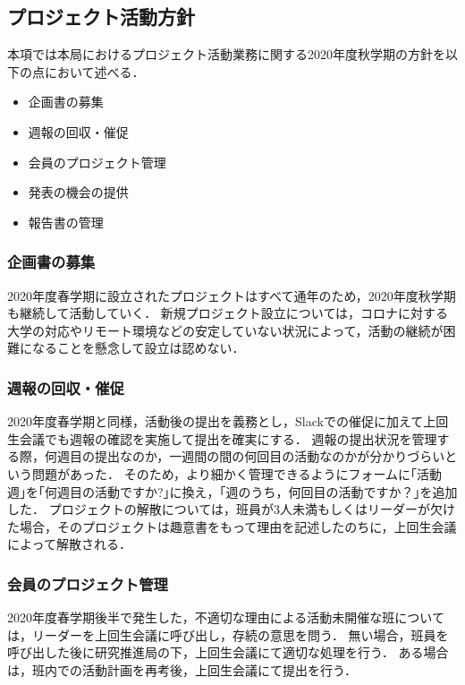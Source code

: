 \subsection*{プロジェクト活動方針}


本項では本局におけるプロジェクト活動業務に関する2020年度秋学期の方針を以下の点において述べる．

\begin{itemize}
\item 企画書の募集
\item 週報の回収・催促
\item 会員のプロジェクト管理
\item 発表の機会の提供
\item 報告書の管理
\end{itemize}

\subsubsection*{企画書の募集}

2020年度春学期に設立されたプロジェクトはすべて通年のため，2020年度秋学期も継続して活動していく．
新規プロジェクト設立については，コロナに対する大学の対応やリモート環境などの安定していない状況によって，活動の継続が困難になることを懸念して設立は認めない．

\subsubsection*{週報の回収・催促}

2020年度春学期と同様，活動後の提出を義務とし，Slackでの催促に加えて上回生会議でも週報の確認を実施して提出を確実にする．
週報の提出状況を管理する際，何週目の提出なのか，一週間の間の何回目の活動なのかが分かりづらいという問題があった．
そのため，より細かく管理できるようにフォームに｢活動週｣を｢何週目の活動ですか?｣に換え，｢週のうち，何回目の活動ですか？｣を追加した．
プロジェクトの解散については，班員が3人未満もしくはリーダーが欠けた場合，そのプロジェクトは趣意書をもって理由を記述したのちに，上回生会議によって解散される．

\subsubsection*{会員のプロジェクト管理}

2020年度春学期後半で発生した，不適切な理由による活動未開催な班については，リーダーを上回生会議に呼び出し，存続の意思を問う．
無い場合，班員を呼び出した後に研究推進局の下，上回生会議にて適切な処理を行う．
ある場合は，班内での活動計画を再考後，上回生会議にて提出を行う．

